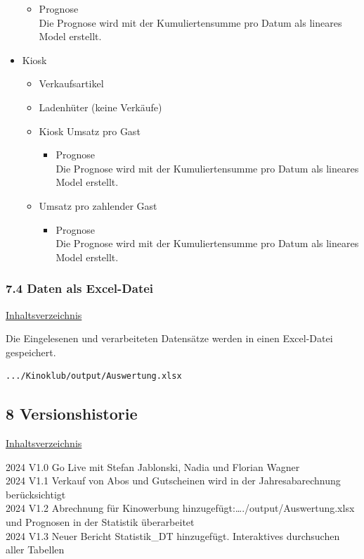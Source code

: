 \documentclass[
]{article}
\providecommand{\tightlist}{%
  \setlength{\itemsep}{0pt}\setlength{\parskip}{0pt}}
\begin{document}
\begin{itemize}
  \begin{itemize}
  \tightlist
  \item
    Prognose\\
    Die Prognose wird mit der Kumuliertensumme pro Datum als lineares
    Model erstellt.
  \end{itemize}
\item
  Kiosk

  \begin{itemize}
  \tightlist
  \item
    Verkaufsartikel
  \item
    Ladenhüter (keine Verkäufe)
  \item
    Kiosk Umsatz pro Gast

    \begin{itemize}
    \tightlist
    \item
      Prognose\\
      Die Prognose wird mit der Kumuliertensumme pro Datum als lineares
      Model erstellt.
    \end{itemize}
  \item
    Umsatz pro zahlender Gast

    \begin{itemize}
    \tightlist
    \item
      Prognose\\
      Die Prognose wird mit der Kumuliertensumme pro Datum als lineares
      Model erstellt.
    \end{itemize}
  \end{itemize}
\end{itemize}

\subsubsection{7.4 Daten als Excel-Datei}\label{daten-als-excel-datei}

\hyperref[Inhaltsverzeichnis]{Inhaltsverzeichnis}

Die Eingelesenen und verarbeiteten Datensätze werden in einen
Excel-Datei gespeichert.\\

\begin{verbatim}
.../Kinoklub/output/Auswertung.xlsx
\end{verbatim}

\newpage

\subsection{8 Versionshistorie}\label{versionshistorie}

\hyperref[Inhaltsverzeichnis]{Inhaltsverzeichnis}

2024 V1.0 Go Live mit Stefan Jablonski, Nadia und Florian Wagner\\
2024 V1.1 Verkauf von Abos und Gutscheinen wird in der Jahresabarechnung
berücksichtigt\\
2024 V1.2 Abrechnung für Kinowerbung
hinzugefügt:\ldots./output/Auswertung.xlsx und Prognosen in der
Statistik überarbeitet\\
2024 V1.3 Neuer Bericht Statistik\_DT hinzugefügt. Interaktives
durchsuchen aller Tabellen\\
\end{document}

